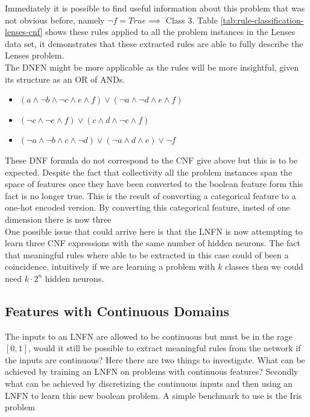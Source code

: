 Immediately it is possible to find useful information about this problem that was not obvious before, namely $\lnot f = True \implies $ Class 3. Table \ref{tab:rule-classification-lenses-cnf} shows these rules applied to all the problem instances in the Lenses data set, it demonstrates that these extracted rules are able to fully describe the Lenses problem.\\

The DNFN might be more applicable as the rules will be more insightful, given its structure as an OR of ANDs.\\

\begin{itemize}
	\item {} $(a \land \lnot b \land \lnot c \land e \land f) \lor (\lnot a \land \lnot d \land e \land f)$
	\item {} $(\lnot c \land \lnot e \land f) \lor (c \land d \land \lnot e \land f)$
	\item {} $(\lnot a \land \lnot b \land c \land \lnot d) \lor (\lnot a \land d \land e) \lor \lnot f$
\end{itemize}


These DNF formula do not correspond to the CNF give above but this is to be expected. Despite the fact that collectivity all the problem instances span the space of features once they have been converted to the boolean feature form this fact is no longer true. This is the result of converting a categorical feature to a one-hot encoded version. By converting this categorical feature, insted of one dimension there is now three\\

One possible issue that could arrive here is that the LNFN is now attempting to learn three CNF expressions with the same number of hidden neurons. The fact that meaningful rules where able to be extracted in this case could of been a coincidence, intuitively if we are learning a problem with $k$ classes then we could need $k \cdot 2^n$ hidden neurons.

\subsection{Features with Continuous Domains}
The inputs to an LNFN are allowed to be continuous but must be in the rage $[0, 1]$, would it still be possible to extract meaningful rules from the network if the inputs are continuous? Here there are two things to investigate. What can be achieved by training an LNFN on problems with continuous features? Secondly what can be achieved by discretizing the continuous inputs and then using an LNFN to learn this new boolean problem. A simple benchmark to use is the Iris problem \cite{Lichman:2013}


